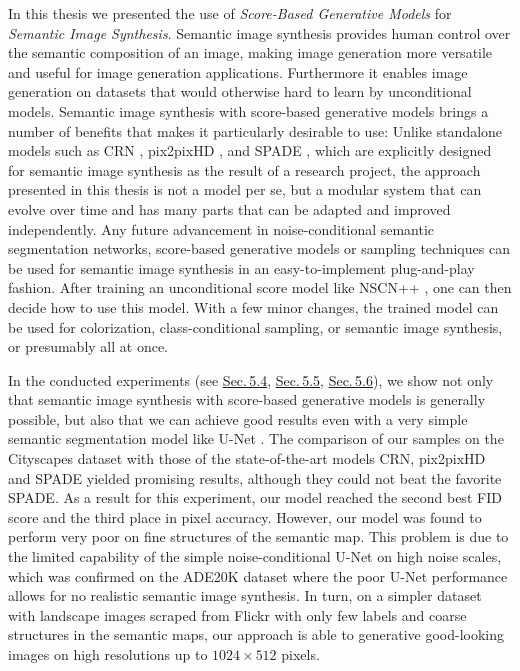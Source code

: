 In this thesis we presented the use of \textit{Score-Based Generative Models} \cite{score_1, score_2, score_3} for \textit{Semantic Image Synthesis}. Semantic image synthesis provides human control over the semantic composition of an image, making image generation more versatile and useful for image generation applications. Furthermore it enables image generation on datasets that would otherwise hard to learn by unconditional models. Semantic image synthesis with score-based generative models brings a number of benefits that makes it particularly desirable to use: Unlike standalone models such as CRN \cite{crn}, pix2pixHD \cite{pix2pixHD}, and SPADE \cite{spade}, which are explicitly designed for semantic image synthesis as the result of a research project, the approach presented in this thesis is not a model per se, but a modular system that can evolve over time and has many parts that can be adapted and improved independently. Any future advancement in noise-conditional semantic segmentation networks, score-based generative models or sampling techniques can be used for semantic image synthesis in an easy-to-implement plug-and-play fashion. After training an unconditional score model like NSCN++ \cite{score_3}, one can then decide how to use this model. With a few minor changes, the trained model can be used for colorization, class-conditional sampling, or semantic image synthesis, or presumably all at once.

In the conducted experiments (see \hyperref[sec:5.4]{Sec.\,5.4}, \hyperref[sec:5.5]{Sec.\,5.5}, \hyperref[sec:5.6]{Sec.\,5.6}), we show not only that semantic image synthesis with score-based generative models is generally possible, but also that we can achieve good results even with a very simple semantic segmentation model like U-Net \cite{unet}. The comparison of our samples on the Cityscapes dataset \cite{cityscapes} with those of the state-of-the-art models CRN, pix2pixHD and SPADE yielded promising results, although they could not beat the favorite SPADE. As a result for this experiment, our model reached the second best FID score \cite{fid} and the third place in pixel accuracy. However, our model was found to perform very poor on fine structures of the semantic map. This problem is due to the limited capability of the simple noise-conditional U-Net on high noise scales, which was confirmed on the ADE20K \cite{ade20k} dataset where the poor U-Net performance allows for no realistic semantic image synthesis. In turn, on a simpler dataset with landscape images scraped from Flickr with only few labels and coarse structures in the semantic maps, our approach is able to generative good-looking images on high resolutions up to $1024\times512$ pixels.

